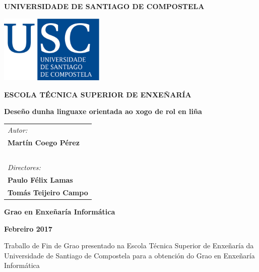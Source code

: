 \pagestyle{empty}
\begin{center}
{\bf\Large UNIVERSIDADE DE SANTIAGO DE COMPOSTELA}

\vspace{0.5cm}
\includegraphics[width=5cm]{figuras/logo_usc.eps}

\vspace{0.5cm}
{\bf\large ESCOLA TÉCNICA SUPERIOR DE ENXEÑARÍA}

\vspace{2cm}
{\bf\LARGE Deseño dunha linguaxe orientada ao xogo de rol en liña}

\end{center}

\vspace{2cm}
\hspace{4cm}\begin{tabular}{l}
{\it\Large Autor:} \\
{\bf\Large Martín Coego Pérez} \\
~ \\
{\it\Large Directores:} \\
{\bf\Large Paulo Félix Lamas} \\
{\bf\Large Tomás Teijeiro Campo} \\
\end{tabular}

\vspace{2cm}
\begin{center}
{\bf\Large Grao en Enxeñaría Informática}

\vspace{0.5cm}
{\bf\large Febreiro 2017}

\vspace{0.5cm}
Traballo de Fin de Grao presentado na Escola Técnica Superior de Enxeñaría da
Universidade de Santiago de Compostela para a obtención do Grao en Enxeñaría
Informática
\end{center}

